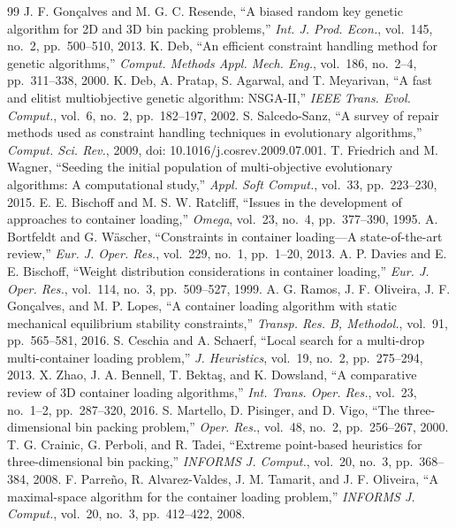 \documentclass[journal]{IEEEtran}
\begin{document}
\begin{thebibliography}{99}
 J. F. Gon\c{c}alves and M. G. C. Resende, ``A biased random key genetic algorithm for 2D and 3D bin packing problems,'' \emph{Int. J. Prod. Econ.}, vol.~145, no.~2, pp.~500--510, 2013.
 K. Deb, ``An efficient constraint handling method for genetic algorithms,'' \emph{Comput. Methods Appl. Mech. Eng.}, vol.~186, no.~2--4, pp.~311--338, 2000.
 K. Deb, A. Pratap, S. Agarwal, and T. Meyarivan, ``A fast and elitist multiobjective genetic algorithm: NSGA-II,'' \emph{IEEE Trans. Evol. Comput.}, vol.~6, no.~2, pp.~182--197, 2002.
 S. Salcedo-Sanz, ``A survey of repair methods used as constraint handling techniques in evolutionary algorithms,'' \emph{Comput. Sci. Rev.}, 2009, doi: 10.1016/j.cosrev.2009.07.001.
 T. Friedrich and M. Wagner, ``Seeding the initial population of multi-objective evolutionary algorithms: A computational study,'' \emph{Appl. Soft Comput.}, vol.~33, pp.~223--230, 2015.
 E. E. Bischoff and M. S. W. Ratcliff, ``Issues in the development of approaches to container loading,'' \emph{Omega}, vol.~23, no.~4, pp.~377--390, 1995.
 A. Bortfeldt and G. W\"ascher, ``Constraints in container loading---A state-of-the-art review,'' \emph{Eur. J. Oper. Res.}, vol.~229, no.~1, pp.~1--20, 2013.
 A. P. Davies and E. E. Bischoff, ``Weight distribution considerations in container loading,'' \emph{Eur. J. Oper. Res.}, vol.~114, no.~3, pp.~509--527, 1999.
 A. G. Ramos, J. F. Oliveira, J. F. Gon\c{c}alves, and M. P. Lopes, ``A container loading algorithm with static mechanical equilibrium stability constraints,'' \emph{Transp. Res. B, Methodol.}, vol.~91, pp.~565--581, 2016.
 S. Ceschia and A. Schaerf, ``Local search for a multi-drop multi-container loading problem,'' \emph{J. Heuristics}, vol.~19, no.~2, pp.~275--294, 2013.
 X. Zhao, J. A. Bennell, T. Bekta\c{s}, and K. Dowsland, ``A comparative review of 3D container loading algorithms,'' \emph{Int. Trans. Oper. Res.}, vol.~23, no.~1--2, pp.~287--320, 2016.
 S. Martello, D. Pisinger, and D. Vigo, ``The three-dimensional bin packing problem,'' \emph{Oper. Res.}, vol.~48, no.~2, pp.~256--267, 2000.
 T. G. Crainic, G. Perboli, and R. Tadei, ``Extreme point-based heuristics for three-dimensional bin packing,'' \emph{INFORMS J. Comput.}, vol.~20, no.~3, pp.~368--384, 2008.
 F. Parre\~no, R. Alvarez-Valdes, J. M. Tamarit, and J. F. Oliveira, ``A maximal-space algorithm for the container loading problem,'' \emph{INFORMS J. Comput.}, vol.~20, no.~3, pp.~412--422, 2008.

\end{thebibliography}
\end{document}
